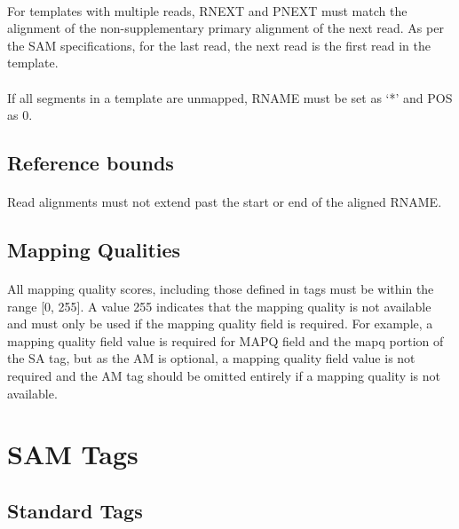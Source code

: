 \documentclass[10pt]{article}
\begin{document}
\paragraph{}

For templates with multiple reads, RNEXT and PNEXT must match the
alignment of the non-supplementary primary alignment of the next read.
As per the SAM specifications, for the last read, the next read is the first read in the template.

\paragraph{}

If all segments in a template are unmapped, RNAME must be set as `*' and POS as 0.

\subsection{Reference bounds}

\paragraph{}

Read alignments must not extend past the start or end of the aligned RNAME.

\subsection{Mapping Qualities}

\paragraph{}

All mapping quality scores, including those defined in tags must be within the range [0, 255].
A value 255 indicates that the mapping quality is not available and must only be used if the
mapping quality field is required. For example, a mapping quality field value is required for
MAPQ field and the mapq portion of the SA tag, but as the AM is optional, a mapping quality
field value is not required and the AM tag should be omitted entirely if a mapping quality is
not available.

\section{SAM Tags}

\subsection{Standard Tags}
\end{document}
